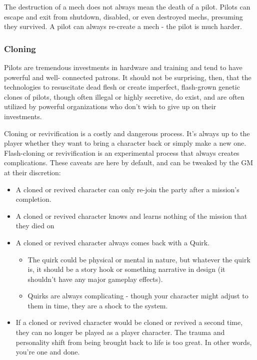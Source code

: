 The destruction of a mech does not always mean the death of a pilot. Pilots can escape and exit from shutdown, disabled, or even destroyed mechs, presuming they survived. A pilot can always re-create a mech - the pilot is much harder.

\subsubsection{Cloning}

Pilots are tremendous investments in hardware and training and tend to have powerful and well- connected patrons. It should not be surprising, then, that the technologies to resuscitate dead flesh or create imperfect, flash-grown genetic clones of pilots, though often illegal or highly secretive, do exist, and are often utilized by powerful organizations who don’t wish to give up on their investments. 

Cloning or revivification is a costly and dangerous process. It’s always up to the player whether they want to bring a character back or simply make a new one. Flash-cloning or revivification is an experimental process that always creates complications. These caveats are here by default, and can be tweaked by the GM at their discretion: 
\begin{itemize}
\item A cloned or revived character can only re-join the party after a mission’s completion. 
\item A cloned or revived character knows and learns nothing of the mission that they died on 
\item A cloned or revived character always comes back with a Quirk. 
\begin{itemize}
\item The quirk could be physical or mental in nature, but whatever the quirk is, it should be a story hook or something narrative in design (it shouldn’t have any major gameplay effects). 
\item Quirks are always complicating - though your character might adjust to them in time, they are a shock to the system.
\end{itemize}
\item If a cloned or revived character would be cloned or revived a second time, they can no longer be played as a player character. The trauma and personality shift from being brought back to life is too great. In other words, you’re one and done.
\end{itemize}

